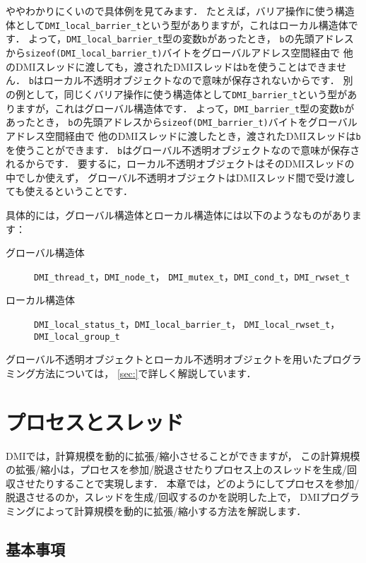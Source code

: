 \documentclass[report,12pt]{jsbook}
\begin{document}
ややわかりにくいので具体例を見てみます．
たとえば，バリア操作に使う構造体として\texttt{DMI\_local\_barrier\_t}という型がありますが，これはローカル構造体です．
よって，\texttt{DMI\_local\_barrier\_t}型の変数\texttt{b}があったとき，
\texttt{b}の先頭アドレスから\texttt{sizeof(DMI\_local\_barrier\_t)}バイトをグローバルアドレス空間経由で
他のDMIスレッドに渡しても，渡されたDMIスレッドは\texttt{b}を使うことはできません．
\texttt{b}はローカル不透明オブジェクトなので意味が保存されないからです．
別の例として，同じくバリア操作に使う構造体として\texttt{DMI\_barrier\_t}という型がありますが，これはグローバル構造体です．
よって，\texttt{DMI\_barrier\_t}型の変数\texttt{b}があったとき，
\texttt{b}の先頭アドレスから\texttt{sizeof(DMI\_barrier\_t)}バイトをグローバルアドレス空間経由で
他のDMIスレッドに渡したとき，渡されたDMIスレッドは\texttt{b}を使うことができます．
\texttt{b}はグローバル不透明オブジェクトなので意味が保存されるからです．
要するに，ローカル不透明オブジェクトはそのDMIスレッドの中でしか使えず，
グローバル不透明オブジェクトはDMIスレッド間で受け渡しても使えるということです．

具体的には，グローバル構造体とローカル構造体には以下のようなものがあります：

\begin{description}
\item[グローバル構造体] \texttt{DMI\_thread\_t}，\texttt{DMI\_node\_t}，
  \texttt{DMI\_mutex\_t}，\texttt{DMI\_cond\_t}，\texttt{DMI\_rwset\_t}
\item[ローカル構造体] \texttt{DMI\_local\_status\_t}，\texttt{DMI\_local\_barrier\_t}，
  \texttt{DMI\_local\_rwset\_t}，\texttt{DMI\_local\_group\_t}
\end{description}

グローバル不透明オブジェクトとローカル不透明オブジェクトを用いたプログラミング方法については，
\ref{sec:}で詳しく解説しています．

\chapter{プロセスとスレッド}

DMIでは，計算規模を動的に拡張/縮小させることができますが，
この計算規模の拡張/縮小は，プロセスを参加/脱退させたりプロセス上のスレッドを生成/回収させたりすることで実現します．
本章では，どのようにしてプロセスを参加/脱退させるのか，スレッドを生成/回収するのかを説明した上で，
DMIプログラミングによって計算規模を動的に拡張/縮小する方法を解説します．

\section{基本事項}
\end{document}
